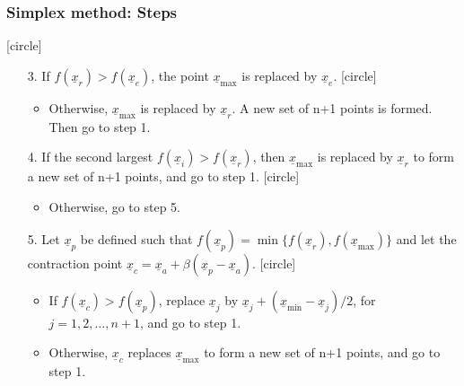 \documentclass{beamer}
\begin{document}
\begin{frame}
    \frametitle{Simplex method: Steps}
    [circle]
    \begin{enumerate}
        \item[3.]If $f(\underline{x}_r)>f(\underline{x}_e)$, the point $\underline{x}_{\max}$ is \alert{replaced} by $\underline{x}_e$.
        [circle]
        \begin{itemize}
            \item Otherwise, $\underline{x}_{\max}$ is \alert{replaced} by $\underline{x}_r$.
            A new set of n+1 points is formed. Then go to step 1.
        \end{itemize}
        \item[4.]If the second largest $f(\underline{x}_i)>f(\underline{x}_{r})$,
         then $\underline{x}_{\max}$ is \alert{replaced} by $\underline{x}_r$ to form a new set of n+1 points,
         and go to step 1.
         [circle]
         \begin{itemize}
             \item Otherwise, go to step 5.
         \end{itemize}
        \item[5.] Let $\underline{x}_p$ be defined such that $f(\underline{x}_p)=\min{\{f(\underline{x}_r), f(\underline{x}_{\max})\}}$
        and let the contraction point $\underline{x}_c=\underline{x}_a+\beta (\underline{x}_p-\underline{x}_a)$.
        [circle]
        \begin{itemize}
            \item If $f(\underline{x}_c)>f(\underline{x}_p)$, \alert{replace} $\underline{x}_j$ by $\underline{x}_j+(\underline{x}_{\min}-\underline{x}_j)/2$, for $j=1,2,\dots,n+1$, and go to step 1.
            \item Otherwise, $\underline{x}_c$ \alert{replaces} $\underline{x}_{\max}$ to form a new set of n+1 points, and go to step 1.
        \end{itemize}
    \end{enumerate}
\end{frame}
\end{document}
